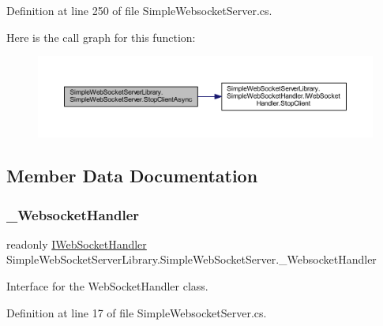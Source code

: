 Definition at line 250 of file Simple\+Websocket\+Server.\+cs.

Here is the call graph for this function\+:
\nopagebreak
\begin{figure}[H]
\begin{center}
\leavevmode
\includegraphics[width=350pt]{class_simple_web_socket_server_library_1_1_simple_web_socket_server_ad0559ffe3b936e25e202b205fa2931a7_cgraph}
\end{center}
\end{figure}


\subsection{Member Data Documentation}
\mbox{\label{class_simple_web_socket_server_library_1_1_simple_web_socket_server_a4bfb888a3f666e48f561a55373eb4bd3}} 
\subsubsection{\texorpdfstring{\+\_\+\+Websocket\+Handler}{\_WebsocketHandler}}
{\footnotesize\ttfamily readonly \mbox{\hyperlink{interface_simple_web_socket_server_library_1_1_simple_web_socket_handler_1_1_i_web_socket_handler}{I\+Web\+Socket\+Handler}} Simple\+Web\+Socket\+Server\+Library.\+Simple\+Web\+Socket\+Server.\+\_\+\+Websocket\+Handler\hspace{0.3cm}{\ttfamily [private]}}



Interface for the Web\+Socket\+Handler class. 



Definition at line 17 of file Simple\+Websocket\+Server.\+cs.

